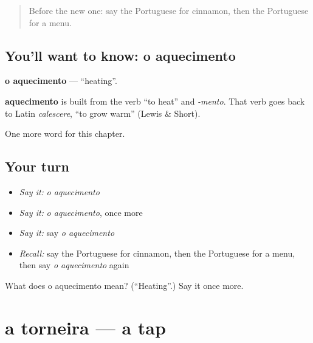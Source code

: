 \label{lesson:PT-C199-aquecimento}



\begin{quote}
Before the new one: say the Portuguese for cinnamon, then the Portuguese for a menu.
\end{quote}

\subsection*{You'll want to know: o aquecimento}
\textbf{o aquecimento} — \textquotedblleft{}heating\textquotedblright{}.

\begin{cousinweb}
\textbf{aquecimento} is built from the verb \textquotedblleft{}to heat\textquotedblright{} and \emph{-mento}. That verb goes back to Latin \emph{calescere}, \textquotedblleft{}to grow warm\textquotedblright{} (Lewis \& Short).
\end{cousinweb}

\begin{grammarlens}[title={What you've built}]
One more word for this chapter.
\end{grammarlens}

\subsection*{Your turn}
\begin{itemize}
\raggedright
  \item \emph{Say it:} \emph{o aquecimento}
  \item \emph{Say it:} \emph{o aquecimento}, once more
  \item \emph{Say it:} say \emph{o aquecimento}
  \item \emph{Recall:} say the Portuguese for cinnamon, then the Portuguese for a menu, then say \emph{o aquecimento} again
\end{itemize}

\begin{tcolorbox}[breakable,colback=teal!4,colframe=teal!35!black,title={Before you move on}]
What does o aquecimento mean? (\textquotedblleft{}Heating\textquotedblright{}.) Say it once more.
\end{tcolorbox}
\section[a torneira]{a torneira — a tap}

\label{lesson:PT-C199-torneira}



